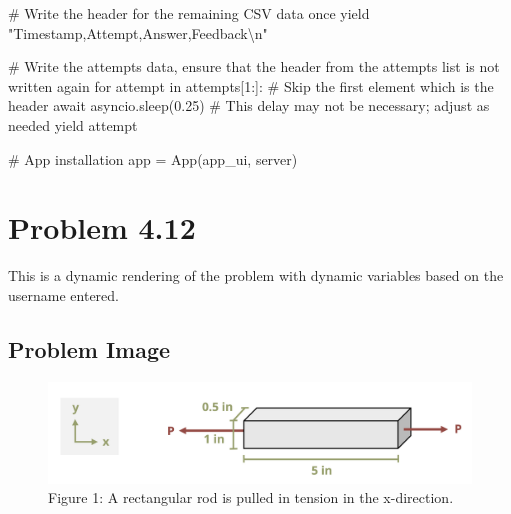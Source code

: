 \documentclass[
  letterpaper,
  DIV=11,
  numbers=noendperiod]{scrreprt}
\newenvironment{Shaded}{\begin{snugshade}}{\end{snugshade}}
\newcommand{\NormalTok}[1]{\textcolor[rgb]{0.00,0.23,0.31}{#1}}
\begin{document}
\begin{Shaded}
\begin{Highlighting}[]
\NormalTok{        \# Write the header for the remaining CSV data once}
\NormalTok{        yield "Timestamp,Attempt,Answer,Feedback\textbackslash{}n"}
        
\NormalTok{        \# Write the attempts data, ensure that the header from the attempts list is not written again}
\NormalTok{        for attempt in attempts[1:]:  \# Skip the first element which is the header}
\NormalTok{            await asyncio.sleep(0.25)  \# This delay may not be necessary; adjust as needed}
\NormalTok{            yield attempt}


\NormalTok{\# App installation}
\NormalTok{app = App(app\_ui, server)}
\end{Highlighting}
\end{Shaded}

\chapter*{Problem 4.12}\label{problem-4.12}


This is a dynamic rendering of the problem with dynamic variables based
on the username entered.

\section*{Problem Image}\label{problem-image-36}


\begin{figure}[H]

{\centering \includegraphics{images/216.png}

}

\caption{Figure 1: A rectangular rod is pulled in tension in the
x-direction.}

\end{figure}%
\end{document}
